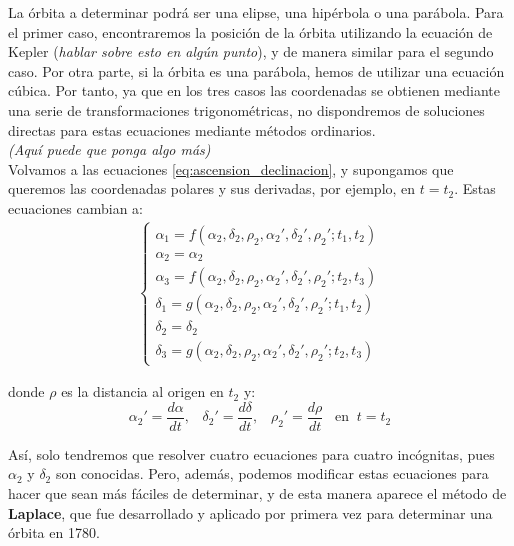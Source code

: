 \documentclass[11pt]{article}
\begin{document}
La órbita a determinar podrá ser una elipse, una hipérbola o una parábola. Para el primer caso, encontraremos la posición de la órbita utilizando la ecuación de Kepler (\textit{hablar sobre esto en algún punto}), y de manera similar para el segundo caso. Por otra parte, si la órbita es una parábola, hemos de utilizar una ecuación cúbica. Por tanto, ya que en los tres casos las coordenadas se obtienen mediante una serie de transformaciones trigonométricas, no dispondremos de soluciones directas para estas ecuaciones mediante métodos ordinarios.\\

\textit{(Aquí puede que ponga algo más)}\\

Volvamos a las ecuaciones \eqref{eq:ascension_declinacion}, y supongamos que queremos las coordenadas polares y sus derivadas, por ejemplo, en $t=t_2$. Estas ecuaciones cambian a:
\begin{align}
\left\{\begin{array}{l}
	\alpha_1 = f(\alpha_2, \delta_2, \rho_2, \alpha_2', \delta_2', \rho_2'; t_1, t_2)\\ 
	\alpha_2 = \alpha_2\\
	\alpha_3 = f(\alpha_2, \delta_2, \rho_2, \alpha_2', \delta_2', \rho_2'; t_2, t_3)\\
	\delta_1 = g(\alpha_2, \delta_2, \rho_2, \alpha_2', \delta_2', \rho_2'; t_1, t_2)\\
	\delta_2 = \delta_2\\
	\delta_3 = g(\alpha_2, \delta_2, \rho_2, \alpha_2', \delta_2', \rho_2'; t_2, t_3)
\end{array}
\right.
\label{eq:idea_laplace}
\end{align}

\noindent donde $\rho$ es la distancia al origen en $t_2$ y:
\[
\alpha_2'=\frac{d\alpha}{dt}, \; \; \; \delta_2'=\frac{d\delta}{dt}, \; \; \; \rho_2'=\frac{d\rho}{dt} \; \; \;  \text{en} \; \; t=t_2
\]

Así, solo tendremos que resolver cuatro ecuaciones para cuatro incógnitas, pues $\alpha_2$ y $\delta_2$ son conocidas. Pero, además, podemos modificar estas ecuaciones para hacer que sean más fáciles de determinar, y de esta manera aparece el método de \textbf{Laplace}, que fue desarrollado y aplicado por primera vez para determinar una órbita en 1780.\\
\end{document}
